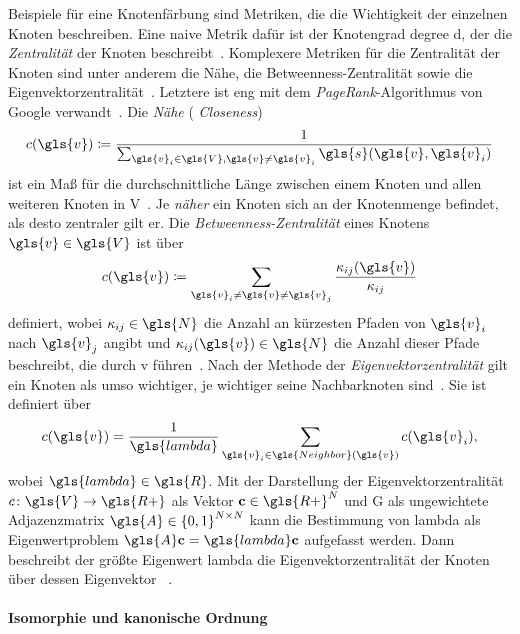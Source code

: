 Beispiele für eine Knotenfärbung sind Metriken, die die Wichtigkeit der einzelnen Knoten beschreiben.
Eine naive Metrik dafür ist \zB{} der Knotengrad \gls{degree} \bzw{} \gls{d}, der die \emph{Zentralität} der Knoten beschreibt~\cite{patchy}.
Komplexere Metriken für die Zentralität der Knoten sind unter anderem die Nähe, die Betweenness-Zentralität sowie die Eigenvektorzentralität~\cite{patchy, centrality}.
Letztere ist eng mit dem \emph{PageRank}-Algorithmus von Google verwandt~\cite{centrality}.
Die \emph{Nähe} (\engl{} \emph{Closeness})
\begin{equation*}
  c\left(\gls{v}\right) \coloneqq \frac{1}{\sum_{\gls{v}_i \in \gls{V}, \gls{v} \neq \gls{v}_i} \gls{s}\left(\gls{v}, \gls{v}_i\right)}
\end{equation*}
ist ein Maß für die durchschnittliche Länge zwischen einem Knoten und allen weiteren Knoten in \gls{V}~\cite{centrality}.
Je \emph{näher} ein Knoten sich an der Knotenmenge befindet, als desto zentraler gilt er.
Die \emph{Betweenness-Zentralität} eines Knotens $\gls{v} \in \gls{V}$ ist über
\begin{equation*}
  c\left(\gls{v}\right) \coloneqq \sum_{\gls{v}_i \neq \gls{v} \neq \gls{v}_j} \frac{\kappa_{ij}\left(\gls{v}\right)}{\kappa_{ij}}
\end{equation*}
definiert, wobei $\kappa_{ij} \in \gls{N}$ die Anzahl an kürzesten Pfaden von $\gls{v}_i$ nach $\gls{v}_j$ angibt und $\kappa_{ij}\left(\gls{v}\right) \in \gls{N}$ die Anzahl dieser Pfade beschreibt, die durch \gls{v} führen~\cite{centrality}.
Nach der Methode der \emph{Eigenvektorzentralität} gilt ein Knoten als umso wichtiger, je wichtiger seine Nachbarknoten sind~\cite{centrality}.
Sie ist definiert über
\begin{equation*}
  c\left(\gls{v}\right) = \frac{1}{\gls{lambda}} \sum_{\gls{v}_i \in \gls{Neighbor}\left(\gls{v}\right)} c\left(\gls{v}_i\right),
\end{equation*}
wobei $\gls{lambda} \in \gls{R}$.
Mit der Darstellung der Eigenvektorzentralität $c \colon \gls{V} \to \gls{R+}$ als Vektor $\ve{c} \in \gls{R+}^N$ und \gls{G} als ungewichtete Adjazenzmatrix $\gls{A} \in {\left\{0,1\right\}}^{N \times N}$ kann die Bestimmung von \gls{lambda} \bzw{}  als Eigenwertproblem $\gls{A}\ve{c} = \gls{lambda}\ve{c}$ aufgefasst werden.
Dann beschreibt der größte Eigenwert \gls{lambda} die Eigenvektorzentralität der Knoten über dessen Eigenvektor ~\cite{centrality}.

\paragraph{Isomorphie und kanonische Ordnung}
\label{isomorphie_und_kanonische_ordnung}

